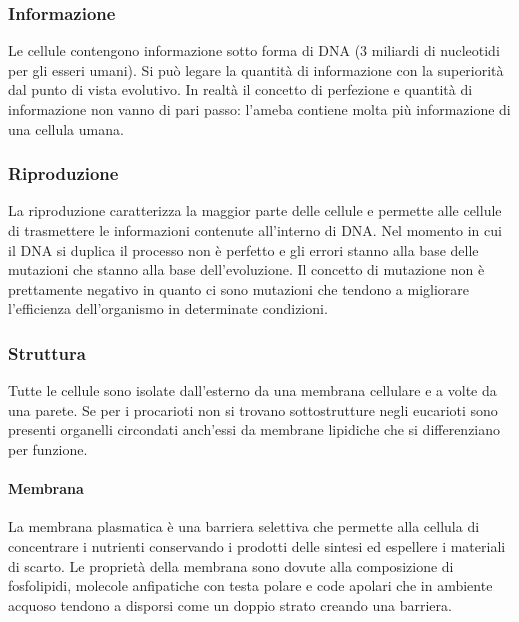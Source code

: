 \subsubsection{Informazione}
Le cellule contengono informazione sotto forma di DNA ($3$ miliardi di nucleotidi per gli esseri umani). Si pu\`o legare la quantit\`a di informazione con la superiorit\`a dal punto di 
vista evolutivo. In realt\`a il concetto di perfezione e quantit\`a di informazione non vanno di pari passo: l'ameba contiene molta pi\`u informazione di una cellula umana. 
\subsubsection{Riproduzione}
La riproduzione caratterizza la maggior parte delle cellule e permette alle cellule di trasmettere le informazioni contenute all'interno di DNA. Nel momento in cui il DNA si duplica il 
processo non \`e perfetto e gli errori stanno alla base delle mutazioni che stanno alla base dell'evoluzione. Il concetto di mutazione non \`e prettamente negativo in quanto ci sono 
mutazioni che tendono a migliorare l'efficienza dell'organismo in determinate condizioni.
\subsubsection{Struttura}
Tutte le cellule sono isolate dall'esterno da una membrana cellulare e a volte da una parete. Se per i procarioti non si trovano sottostrutture negli eucarioti sono presenti organelli
circondati anch'essi da membrane lipidiche che si differenziano per funzione.
\paragraph{Membrana}
La membrana plasmatica \`e una barriera selettiva che permette alla cellula di concentrare i nutrienti conservando i prodotti delle sintesi ed espellere i materiali di scarto. Le 
propriet\`a della membrana sono dovute alla composizione di fosfolipidi, molecole anfipatiche con testa polare e code apolari che in ambiente acquoso tendono a disporsi come un doppio
strato creando una barriera.
